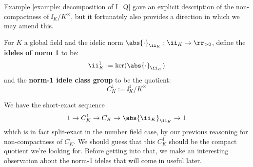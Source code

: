 \documentclass[11pt, x11names, openany]{book}
\begin{document}
Example \ref{example: decomposition of I_Q} gave an explicit description of the non-compactness of $\ii_K/K^\times$, but it fortunately also provides a direction in which we may amend this.

\begin{defn}
    \label{def: norm-one ideles and idele class group}
For $K$ a global field and the idelic norm $\abs{\cdot}_{\ii_K}: \ii_K \to \rr_{> 0}$, define the \textbf{ideles of norm 1} to be:
\begin{equation*}
    \ii^1_K := \ker(\abs{\cdot}_{\ii_K})
\end{equation*}
and the \textbf{norm-1 idele class group} to be the quotient:
\begin{equation*}
    C^1_K := \ii_K^1/K^\times
\end{equation*}
\end{defn}


We have the short-exact sequence
\begin{equation*}
    1 \to C^1_K \to C_K \to \abs{\ii_K}_{\ii_K} \to 1
\end{equation*}
which is in fact split-exact in the number field case, by our previous reasoning for non-compactness of $C_K$. We should guess that this $C^1_K$ should be the compact quotient we're looking for. Before getting into that, we make an interesting observation about the norm-1 ideles that will come in useful later.
\end{document}
